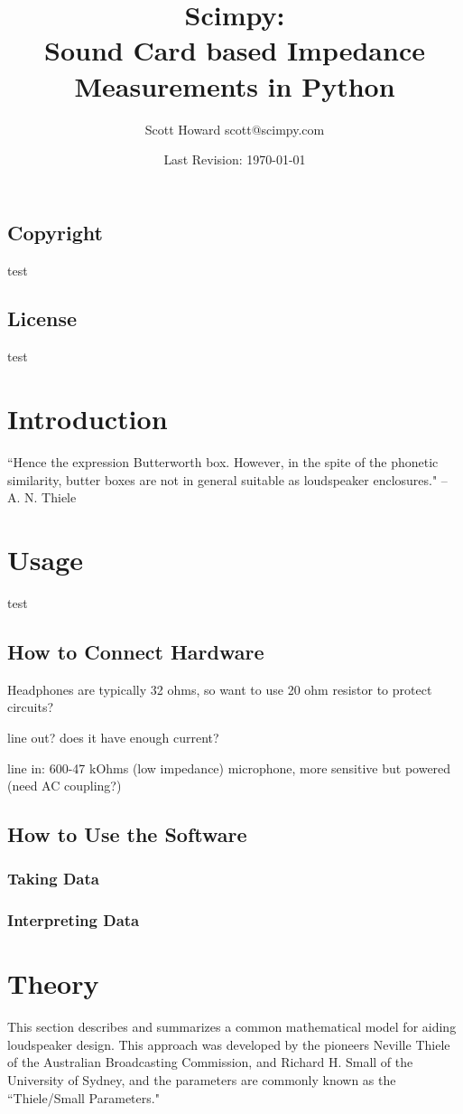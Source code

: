 \documentclass[10pt,letterpaper]{book}
\author{Scott Howard scott@scimpy.com}
\title{Scimpy:\\ \textbf{S}ound \textbf{C}ard based \textbf{I}mpedance \textbf{M}easurements in \textbf{Py}thon}
\date{Last Revision: \today}
\begin{document}
\frontmatter

\maketitle

\section*{Copyright}
test

\section*{License}
test


\tableofcontents

\mainmatter
\chapter{Introduction}
``Hence the expression Butterworth box. However, in the spite of the phonetic similarity, butter boxes are not in general suitable as loudspeaker enclosures." -- A. N. Thiele
\chapter{Usage}
test
\section{How to Connect Hardware}
Headphones are typically 32 ohms, so want to use 20 ohm resistor to protect circuits?

line out? does it have enough current?

line in: 600-47 kOhms (low impedance)
microphone, more sensitive but powered (need AC coupling?)
\section{How to Use the Software}
\subsection{Taking Data}
\subsection{Interpreting Data}
\chapter{Theory}
This section describes and summarizes a common mathematical model for aiding loudspeaker design. This approach was developed by the pioneers Neville Thiele of the Australian Broadcasting Commission, and Richard H. Small of the University of Sydney, and the parameters are commonly known as the ``Thiele/Small Parameters."
\end{document}
